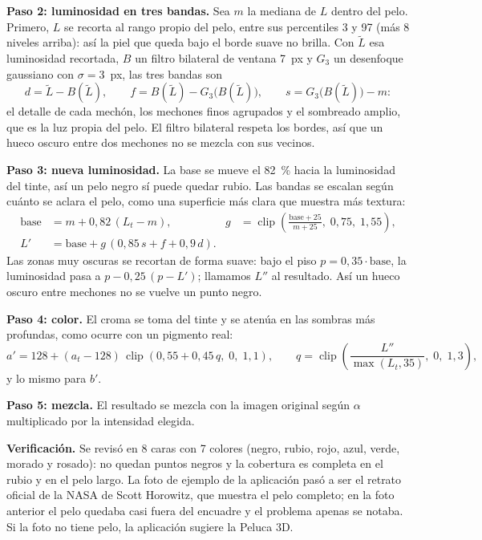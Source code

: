 \textbf{Paso 2: luminosidad en tres bandas.} Sea $m$ la mediana de $L$ dentro del pelo. Primero, $L$ se recorta al rango propio del pelo, entre sus percentiles 3 y 97 (más 8 niveles arriba): así la piel que queda bajo el borde suave no brilla. Con $\tilde L$ esa luminosidad recortada, $B$ un filtro bilateral \cite{tomasi1998} de ventana 7~px y $G_3$ un desenfoque gaussiano con $\sigma=3$~px, las tres bandas son
\begin{equation}
  d=\tilde L-B(\tilde L),\qquad f=B(\tilde L)-G_3\big(B(\tilde L)\big),\qquad s=G_3\big(B(\tilde L)\big)-m:
\end{equation}
el detalle de cada mechón, los mechones finos agrupados y el sombreado amplio, que es la luz propia del pelo. El filtro bilateral respeta los bordes, así que un hueco oscuro entre dos mechones no se mezcla con sus vecinos.

\textbf{Paso 3: nueva luminosidad.} La base se mueve el 82~\% hacia la luminosidad del tinte, así un pelo negro sí puede quedar rubio. Las bandas se escalan según cuánto se aclara el pelo, como una superficie más clara que muestra más textura:
\begin{align}
  \text{base}&=m+0{,}82\,(L_t-m), & g&=\operatorname{clip}\!\left(\frac{\text{base}+25}{m+25},\;0{,}75,\;1{,}55\right),\\
  L'&=\text{base}+g\,(0{,}85\,s+f+0{,}9\,d).
\end{align}
Las zonas muy oscuras se recortan de forma suave: bajo el piso $p=0{,}35\cdot\text{base}$, la luminosidad pasa a $p-0{,}25\,(p-L')$; llamamos $L''$ al resultado. Así un hueco oscuro entre mechones no se vuelve un punto negro.

\textbf{Paso 4: color.} El croma se toma del tinte y se atenúa en las sombras más profundas, como ocurre con un pigmento real:
\begin{equation}
  a'=128+(a_t-128)\,\operatorname{clip}(0{,}55+0{,}45\,q,\;0,\;1{,}1),\qquad q=\operatorname{clip}\!\left(\frac{L''}{\max(L_t,35)},\;0,\;1{,}3\right),
\end{equation}
y lo mismo para $b'$.

\textbf{Paso 5: mezcla.} El resultado se mezcla con la imagen original según $\alpha$ multiplicado por la intensidad elegida.

\textbf{Verificación.} Se revisó en 8 caras con 7 colores (negro, rubio, rojo, azul, verde, morado y rosado): no quedan puntos negros y la cobertura es completa en el rubio y en el pelo largo. La foto de ejemplo de la aplicación pasó a ser el retrato oficial de la NASA de Scott Horowitz, que muestra el pelo completo; en la foto anterior el pelo quedaba casi fuera del encuadre y el problema apenas se notaba. Si la foto no tiene pelo, la aplicación sugiere la Peluca 3D.

